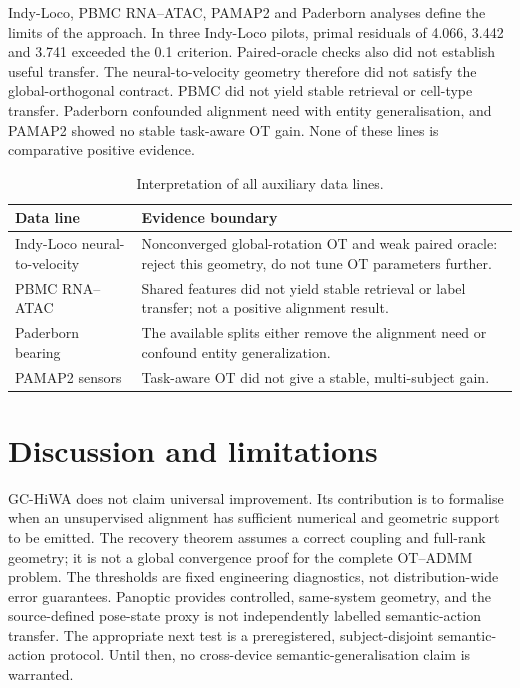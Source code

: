 \documentclass[10pt,a4paper]{article}
\begin{document}
Indy-Loco, PBMC RNA--ATAC, PAMAP2 and Paderborn analyses define the limits of the approach. In three Indy-Loco pilots, primal residuals of 4.066, 3.442 and 3.741 exceeded the 0.1 criterion. Paired-oracle checks also did not establish useful transfer. The neural-to-velocity geometry therefore did not satisfy the global-orthogonal contract. PBMC did not yield stable retrieval or cell-type transfer. Paderborn confounded alignment need with entity generalisation, and PAMAP2 showed no stable task-aware OT gain. None of these lines is comparative positive evidence.

\begin{table}[t]\centering\small\caption{Interpretation of all auxiliary data lines.}\begin{tabularx}{\linewidth}{lX}\toprule
Data line & Evidence boundary\\\midrule
Indy-Loco neural-to-velocity & Nonconverged global-rotation OT and weak paired oracle: reject this geometry, do not tune OT parameters further.\\
PBMC RNA--ATAC & Shared features did not yield stable retrieval or label transfer; not a positive alignment result.\\
Paderborn bearing & The available splits either remove the alignment need or confound entity generalization.\\
PAMAP2 sensors & Task-aware OT did not give a stable, multi-subject gain.\\
\bottomrule\end{tabularx}\end{table}

\section{Discussion and limitations}
GC-HiWA does not claim universal improvement. Its contribution is to formalise when an unsupervised alignment has sufficient numerical and geometric support to be emitted. The recovery theorem assumes a correct coupling and full-rank geometry; it is not a global convergence proof for the complete OT--ADMM problem. The thresholds are fixed engineering diagnostics, not distribution-wide error guarantees. Panoptic provides controlled, same-system geometry, and the source-defined pose-state proxy is not independently labelled semantic-action transfer. The appropriate next test is a preregistered, subject-disjoint semantic-action protocol. Until then, no cross-device semantic-generalisation claim is warranted.
\end{document}
